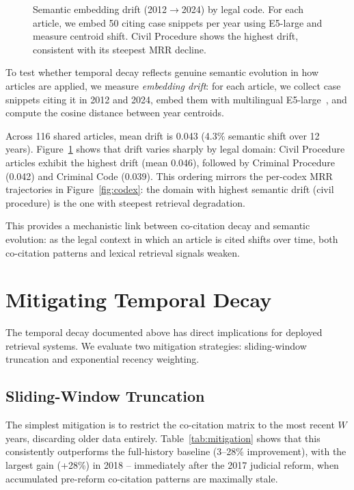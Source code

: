 \documentclass[11pt]{article}
\begin{document}
\begin{figure}[t]
\centering

\caption{Semantic embedding drift (2012$\to$2024) by legal code. For each article, we embed 50 citing case snippets per year using E5-large and measure centroid shift. Civil Procedure shows the highest drift, consistent with its steepest MRR decline.}
\label{fig:drift}
\end{figure}

To test whether temporal decay reflects genuine semantic evolution in how articles are applied, we measure \emph{embedding drift}: for each article, we collect case snippets citing it in 2012 and 2024, embed them with multilingual E5-large~\citep{wang2024multilingual}, and compute the cosine distance between year centroids.

Across 116 shared articles, mean drift is 0.043 (4.3\% semantic shift over 12 years).
Figure~\ref{fig:drift} shows that drift varies sharply by legal domain:
Civil Procedure articles exhibit the highest drift (mean 0.046), followed by Criminal Procedure (0.042) and Criminal Code (0.039).
This ordering mirrors the per-codex MRR trajectories in Figure~\ref{fig:codex}: the domain with highest semantic drift (civil procedure) is the one with steepest retrieval degradation.

This provides a mechanistic link between co-citation decay and semantic evolution: as the legal context in which an article is cited shifts over time, both co-citation patterns and lexical retrieval signals weaken.

\section{Mitigating Temporal Decay}
\label{sec:mitigation}

The temporal decay documented above has direct implications for deployed retrieval systems.
We evaluate two mitigation strategies: sliding-window truncation and exponential recency weighting.

\subsection{Sliding-Window Truncation}

The simplest mitigation is to restrict the co-citation matrix to the most recent $W$ years, discarding older data entirely.
Table~\ref{tab:mitigation} shows that this consistently outperforms the full-history baseline (3--28\% improvement), with the largest gain (+28\%) in 2018 -- immediately after the 2017 judicial reform, when accumulated pre-reform co-citation patterns are maximally stale.
\end{document}
